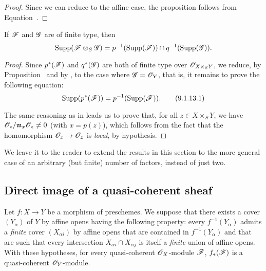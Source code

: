 \begin{proof}
\label{proof-1.9.1.12}
Since we can reduce to the affine case, the proposition follows from
Equation~.
\end{proof}

\begin{corollary}[9.1.13]
\label{1.9.1.13}
If $\mathscr{F}$ and $\mathscr{G}$ are of finite type, then
\[
  \operatorname{Supp}(\mathscr{F}\otimes_S\mathscr{G})=p^{-1}(\operatorname{Supp}(\mathscr{F}))\cap q^{-1}(\operatorname{Supp}(\mathscr{G})).
\]
\end{corollary}

\begin{proof}
\label{proof-1.9.1.13}
Since $p^*(\mathscr{F})$ and $q^*(\mathscr{G})$ are both of finite type over
$\mathscr{O}_{X\times_S Y}$, we reduce, by Proposition~ and
by , to the case where $\mathscr{G}=\mathscr{O}_Y$, that
is, it remains to prove the following equation:
\[
\label{1.9.1.13.1}
  \operatorname{Supp}(p^*(\mathscr{F}))=p^{-1}(\operatorname{Supp}(\mathscr{F})).
  \tag{9.1.13.1}
\]

The same reasoning as in  leads us to prove that, for all
$z\in X\times_S Y$, we have $\mathscr{O}_z/\mathfrak{m}_x\mathscr{O}_z\neq0$ (with $x=p(z)$),
which follows from the fact that the homomorphism $\sh{O}_x\to\sh{O}_z$ is \emph{local},
by hypothesis.
\end{proof}

We leave it to the reader to extend the results in this section to the more
general case of an arbitrary (but finite) number of factors, instead of just two.

\subsection{Direct image of a quasi-coherent sheaf}
\label{subsection:1.9.2.1}

\begin{proposition}[9.2.1]
\label{1.9.2.1}
Let $f:X\to Y$ be a morphism of
preschemes. We suppose that there exists a cover $(Y_\alpha)$ of $Y$ by affine
opens having the following property: every $f^{-1}(Y_\alpha)$ admits a
\emph{finite} cover $(X_{\alpha i})$ by affine opens that are contained in
$f^{-1}(Y_\alpha)$ and that are such that every intersection $X_{\alpha i}\cap X_{\alpha j}$
is itself a \emph{finite} union of affine opens. With these hypotheses, for
every quasi-coherent $\mathscr{O}_X$-module $\mathscr{F}$, $f_*(\mathscr{F})$ is a
quasi-coherent $\mathscr{O}_Y$-module.
\end{proposition}

